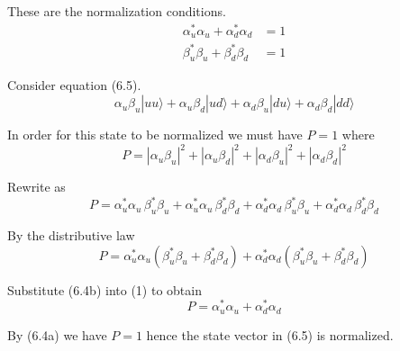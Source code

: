 


\bigskip
These are the normalization conditions.
\begin{align*}
\alpha_u^*\alpha_u+\alpha_d^*\alpha_d&=1\tag{6.4a}
\\[1ex]
\beta_u^*\beta_u+\beta_d^*\beta_d&=1\tag{6.4b}
\end{align*}

Consider equation (6.5).
\begin{equation*}
\alpha_u\beta_u|uu\rangle
+\alpha_u\beta_d|ud\rangle
+\alpha_d\beta_u|du\rangle
+\alpha_d\beta_d|dd\rangle
\tag{6.5}
\end{equation*}

In order for this state to be normalized we must have $P=1$ where
\begin{equation*}
P=|\alpha_u\beta_u|^2+|\alpha_u\beta_d|^2+|\alpha_d\beta_u|^2+|\alpha_d\beta_d|^2
\end{equation*}

Rewrite as
\begin{equation*}
P
=\alpha_u^*\alpha_u\,\beta_u^*\beta_u
+\alpha_u^*\alpha_u\,\beta_d^*\beta_d
+\alpha_d^*\alpha_d\,\beta_u^*\beta_u
+\alpha_d^*\alpha_d\,\beta_d^*\beta_d
\end{equation*}

By the distributive law
\begin{equation*}
P
=\alpha_u^*\alpha_u(\beta_u^*\beta_u+\beta_d^*\beta_d)
+\alpha_d^*\alpha_d(\beta_u^*\beta_u+\beta_d^*\beta_d)
\tag{1}
\end{equation*}

Substitute (6.4b) into (1) to obtain
\begin{equation*}
P=\alpha_u^*\alpha_u+\alpha_d^*\alpha_d
\end{equation*}

By (6.4a) we have $P=1$ hence the state vector in (6.5) is normalized.


